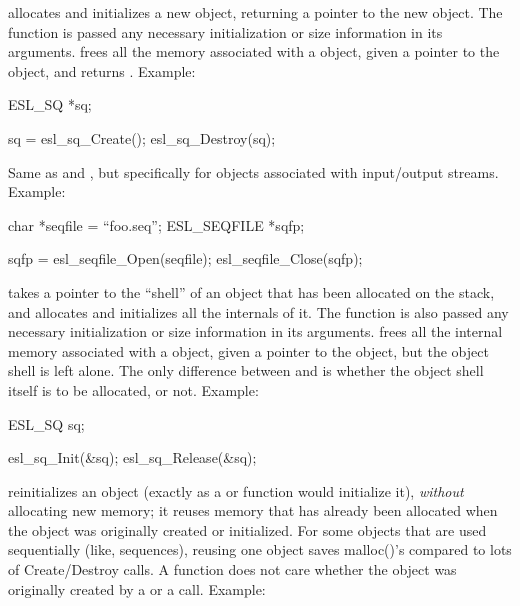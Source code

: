 \begin{sreitems}{}
\item [\ccode{Create,Destroy}] 
   allocates and initializes a new 
  object, returning a pointer to the new
  object. The  function is passed any necessary
  initialization or size information in its arguments.
   frees all the memory associated
  with a  object,  given a pointer to the object,
  and returns . Example:

\begin{cchunk}
ESL_SQ *sq;

sq = esl_sq_Create();
esl_sq_Destroy(sq);
\end{cchunk}
  
\item [\ccode{Open,Close}] 
  Same as  and , but specifically for
  objects associated with input/output streams. Example:

\begin{cchunk}
char        *seqfile = ``foo.seq'';
ESL_SEQFILE *sqfp;

sqfp = esl_seqfile_Open(seqfile);
esl_seqfile_Close(sqfp);
\end{cchunk}

\item [\ccode{Init,Release}]
   takes a pointer to the ``shell'' of an
   object that has been allocated on the stack, and
  allocates and initializes all the internals of it. The
   function is also passed any necessary initialization or
  size information in its arguments.  
  frees all the internal memory associated with a  object,
  given a pointer to the object, but the object shell is left alone.
  The only difference between  and
   is whether the object shell itself is to be
  allocated, or not. Example:

\begin{cchunk}
ESL_SQ  sq;

esl_sq_Init(&sq);
esl_sq_Release(&sq);
\end{cchunk}


\item [\ccode{Reuse}] 
    reinitializes an object (exactly as a
    or  function would initialize it), \emph{without}
   allocating new memory; it reuses memory that has
   already been allocated when the object was originally created or
   initialized. For some objects that are used sequentially (like,
   sequences), reusing one object saves malloc()'s compared to
   lots of Create/Destroy calls. A  function does not
   care whether the object was originally created by a 
   or a  call. Example:


\end{sreitems}
